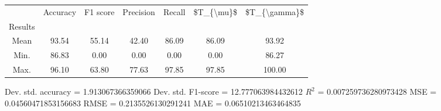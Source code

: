\begin{tabular}{|c|c|c|c|c|c|c|}
\toprule
{} &  Accuracy &  F1 score &  Precision &  Recall &  \$T\_\{\textbackslash mu\}\$ &  \$T\_\{\textbackslash gamma\}\$ \\
Results &           &           &            &         &            &               \\
\hline
Mean    &     93.54 &     55.14 &      42.40 &   86.09 &      86.09 &         93.92 \\
Min.    &     86.83 &      0.00 &       0.00 &    0.00 &       0.00 &         86.27 \\
Max.    &     96.10 &     63.80 &      77.63 &   97.85 &      97.85 &        100.00 \\
\bottomrule
\end{tabular}

 Dev. std. accuracy = 1.913067366359066
 Dev. std. F1-score = 12.777063984432612
 $R^2$ = 0.007259736280973428
 MSE = 0.04560471853156683
 RMSE = 0.2135526130291241
 MAE = 0.06510213463464835